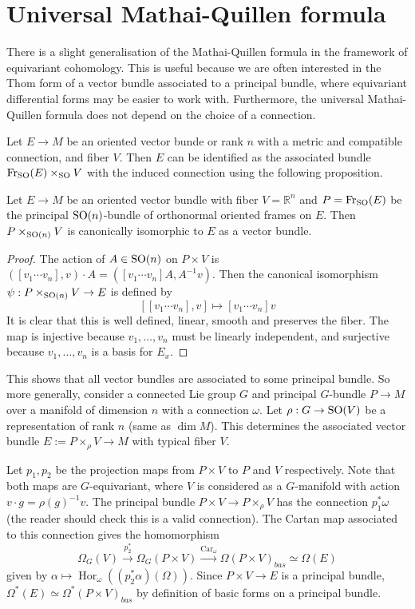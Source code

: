 \section{Universal Mathai-Quillen formula}
There is a slight generalisation of the Mathai-Quillen formula in the framework
of equivariant cohomology. This is useful because we are often interested in
the Thom form of a vector bundle associated to a principal bundle, where
equivariant differential forms may be easier to work with. Furthermore, the
universal Mathai-Quillen formula does not depend on the choice of a
connection. 

Let $E\to M$ be an oriented vector bunde or rank  $n$ with a
metric and compatible connection, and fiber $V$. 
Then $E$ can be identified as the associated bundle $\operatorname{Fr}_{\operatorname{SO}}(E)\times_{\operatorname{SO}} V$ 
with the induced connection using the following proposition. 

\begin{prop}
	Let $E\to M$ be an oriented vector bundle with fiber $V=\mathbb{R}^n$ 
	and  $P=\operatorname{Fr}_{\operatorname{SO}}(E)$ be the
	principal $\operatorname{SO}(n)$-bundle of orthonormal oriented frames on  $E$. Then 
	$P\times_{\operatorname{SO}(n)} V$ is canonically isomorphic to $E$ as a vector bundle. 
\end{prop} 
\begin{proof}
	The action of $A\in\operatorname{SO}(n)$ on $P\times V$ is 
	$
		([v_1 \cdots v_n], v) \cdot A = ([v_1 \cdots v_n] A, A^{-1} v) 
	$.
	Then the canonical isomorphism $\psi : P\times_{\operatorname{SO}(n)} V \to E$ is defined by
	\[
		[[v_1 \cdots v_n], v] \mapsto [v_1 \cdots v_n] v
	\] 
	It is clear that this is well defined, linear, smooth and preserves the
	fiber. The map is injective because $v_1,\ldots,v_n$ must be linearly
	independent, and surjective because $v_1,\ldots,v_n$ is a basis for $E_x$.
\end{proof}

This shows that all vector bundles are associated to some principal bundle. So
more generally, consider a connected Lie group $G$ and 
principal $G$-bundle  $P\to M$ over a manifold of
dimension $n$ with a connection $\omega$. Let $\rho : G \to \operatorname{SO}(V)$ be a 
representation of rank $n$ (same as $\dim M$). 
This determines the associated vector bundle  $E:=P\times_\rho V \to M$
with typical fiber $V$. 

Let $p_1,p_2$ be the projection maps from $P\times V$ to  $P$ and  $V$
respectively. Note that both maps are $G$-equivariant, where 
$V$ is considered as a $G$-manifold with action $v\cdot g = \rho(g)^{-1} v$.
The principal bundle $P\times V \to P\times_\rho V$ has the connection 
$p_1^*\omega$ (the reader should check this is a valid connection).
The Cartan map associated to this 
connection gives the homomorphism
\[
	\Omega_G(V) \xrightarrow{p_2^*} \Omega_G(P\times V) 
	\xrightarrow{\operatorname{Car}_{\omega}} \Omega(P\times V)_{bas}\simeq
	\Omega(E)
\] 
given by $\alpha \mapsto \operatorname{Hor}_{\omega}((p_2^*\alpha)(\Omega))$. 
Since  $P\times V \to E$ is a principal bundle,
$\Omega^*(E)\simeq \Omega^*(P\times V)_{bas}$ by definition of basic forms on a
principal bundle.

